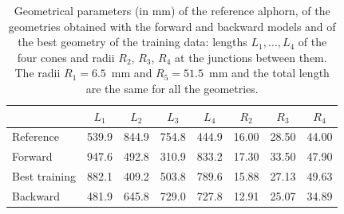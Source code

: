 \begin{table}[H]
\centering
\caption{Geometrical parameters (in mm) of the reference alphorn, of the geometries obtained with the forward and backward models and of the best geometry of the training data: lengths $L_1, \dots, L_4$ of the four cones and radii $R_2$, $R_3$, $R_4$ at the junctions between them. The radii $R_1 = 6.5$~mm and $R_5 = 51.5$~mm and the total length are the same for all the geometries.}
\small
\setlength{\tabcolsep}{5pt}
\begin{tabular}{lccccccc}
\hline
 & $L_1$ & $L_2$ & $L_3$ & $L_4$ & $R_2$ & $R_3$ & $R_4$ \\
\hline
Reference     & 539.9 & 844.9 & 754.8 & 444.9 & 16.00 & 28.50 & 44.00 \\
Forward       & 947.6 & 492.8 & 310.9 & 833.2 & 17.30 & 33.50 & 47.90 \\
Best training & 882.1 & 409.2 & 503.8 & 789.6 & 15.88 & 27.13 & 49.63 \\
Backward      & 481.9 & 645.8 & 729.0 & 727.8 & 12.91 & 25.07 & 34.89 \\
\hline
\end{tabular}
\label{tab:geom_optimized}
\end{table}
